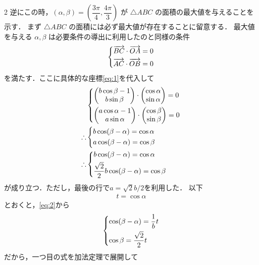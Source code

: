 \documentclass[../../main.tex]{subfiles}
\begin{document}
\begin{multicols}{2}
  逆にこの時，$(\alpha,\beta)=(\dfrac{3\pi}{4},\dfrac{4\pi}{3})$ が $\triangle ABC$ の面積の最大値を与えることを示す．
  まず $\triangle ABC$ の面積には必ず最大値が存在することに留意する．
  最大値を与える $\alpha,\beta$ は必要条件の導出に利用したのと同様の条件
  \begin{align}
    \begin{dcases}
      \overrightarrow{BC}\cdot\overrightarrow{OA}=0 \\
      \overrightarrow{AC}\cdot\overrightarrow{OB}=0
    \end{dcases}
  \end{align}
  を満たす．ここに具体的な座標\cref{eq:1}を代入して
  \begin{align}
    &
    \begin{dcases}
      \mqty(b\cos\beta-1  \\ b\sin\beta) \cdot \mqty(\cos\alpha \\ \sin\alpha) = 0 \\
      \mqty(a\cos\alpha-1 \\ a\sin\alpha) \cdot \mqty( \cos\beta \\ \sin\beta ) = 0
    \end{dcases} \\
    \therefore &
    \begin{dcases}
      b\cos(\beta-\alpha) = \cos\alpha \\
      a\cos(\beta-\alpha) = \cos\beta
    \end{dcases}                                             \\
    \therefore &
    \begin{dcases}
      b\cos(\beta-\alpha) = \cos\alpha \\
      \dfrac{\sqrt{2}}{2}b\cos(\beta-\alpha) = \cos\beta
    \end{dcases} \label{eq:2}
  \end{align}
  が成り立つ．ただし，最後の行で$a=\sqrt{2}b/2$を利用した．
  以下
  \begin{align}
    t = \cos\alpha
  \end{align}
  とおくと，\cref{eq:2}から
  \begin{align}
    \begin{dcases}
      \cos(\beta-\alpha) = \dfrac{1}{b} t \\
      \cos\beta = \dfrac{\sqrt{2}}{2} t
    \end{dcases} \label{eq:3}
  \end{align}
  だから，一つ目の式を加法定理で展開して
  \begin{align}

\end{align}
\end{multicols}
\end{document}
